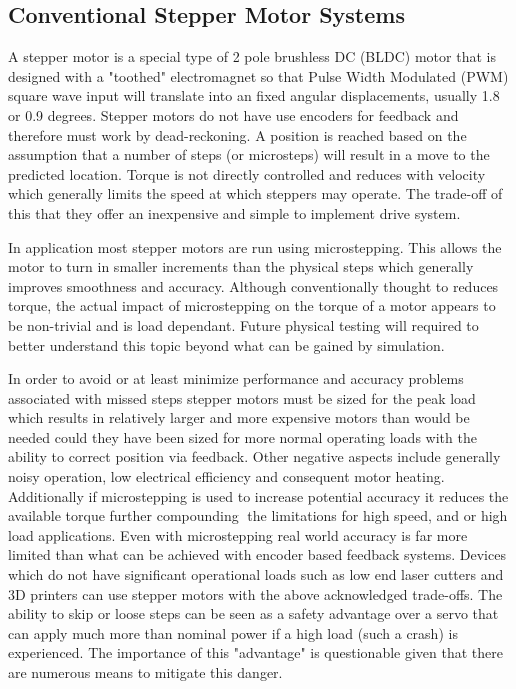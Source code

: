 \documentclass{article}
\begin{document}
\subsection{Conventional Stepper Motor Systems}
A stepper motor is a special type of 2 pole brushless DC (BLDC) motor that is designed with a "toothed" electromagnet so that Pulse Width Modulated (PWM) square wave input will translate into an fixed angular displacements, usually 1.8 or 0.9 degrees. Stepper motors do not have use encoders for feedback and therefore must work by dead-reckoning. A position is reached based on the assumption that a number of steps (or microsteps) will result in a move to the predicted location. Torque is not directly controlled and reduces with velocity which generally limits the speed at which steppers may operate. The trade-off of this that they offer an inexpensive and simple to implement drive system.
\par 
In application most stepper motors are run using microstepping. This allows the motor to turn in smaller increments than the physical steps which generally improves smoothness and accuracy. Although conventionally thought to reduces torque, the actual impact of microstepping on the torque of a motor appears to be non-trivial and is load dependant. Future physical testing will required to better understand this topic beyond what can be gained by simulation. 
\par
In order to avoid or at least minimize performance and accuracy problems associated with missed steps stepper motors must be sized for the peak load which results in relatively larger and more expensive motors than would be needed could they have been sized for more normal operating loads with the ability to correct position via feedback.  Other negative aspects include generally noisy operation, low electrical efficiency and consequent motor heating. Additionally if microstepping is used to increase potential accuracy it reduces the available torque further compounding the limitations for high speed, and or high load applications. Even with microstepping real world accuracy is far more limited than what can be achieved with encoder based feedback systems. Devices which do not have significant operational loads such as low end laser cutters and 3D printers can use stepper motors with the above acknowledged trade-offs. The ability to skip or loose steps can be seen as a safety advantage over a servo that can apply much more than nominal power if a high load (such a crash) is experienced. The importance of this "advantage" is questionable given that there are numerous means to mitigate this danger.  
\end{document}
